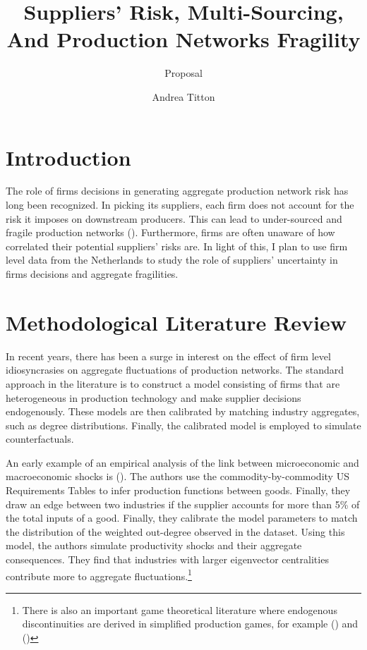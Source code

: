 \documentclass[american, abstract=on]{scrartcl}
\author{Andrea Titton}
\title{Suppliers' Risk, Multi-Sourcing, And Production Networks Fragility}
\subtitle{Proposal}
\newcommand{\citein}[1]{\citeauthor{#1} (\citeyear{#1})}
\begin{document}
\maketitle

\section{Introduction}

The role of firms decisions in generating aggregate production network risk has long been recognized. In picking its suppliers, each firm does not account for the risk it imposes on downstream producers. This can lead to under-sourced and fragile production networks (\cite{steve_banker_if_2020}). Furthermore, firms are often unaware of how correlated their potential suppliers' risks are. In light of this, I plan to use firm level data from the Netherlands to study the role of suppliers' uncertainty in firms decisions and aggregate fragilities.


\section{Methodological Literature Review}

In recent years, there has been a surge in interest on the effect of firm level idiosyncrasies on aggregate fluctuations of production networks. The standard approach in the literature is to construct a model consisting of firms that are heterogeneous in production technology and make supplier decisions endogenously. These models are then calibrated by matching industry aggregates, such as degree distributions. Finally, the calibrated model is employed to simulate counterfactuals.

An early example of an empirical analysis of the link between microeconomic and macroeconomic shocks is \citein{carvalho_supply_2016}. The authors use the commodity-by-commodity US Requirements Tables to infer production functions between goods. Finally, they draw an edge between two industries if the supplier accounts for more than 5\% of the total inputs of a good. Finally, they calibrate the model parameters to match the distribution of the weighted out-degree observed in the dataset. Using this model, the authors simulate productivity shocks and their aggregate consequences. They find that industries with larger eigenvector centralities contribute more to aggregate fluctuations.\footnote{There is also an important game theoretical literature where endogenous discontinuities are derived in simplified production games, for example \citein{elliott_supply_2022} and \citein{amelkin_strategic_2020}}
\end{document}
